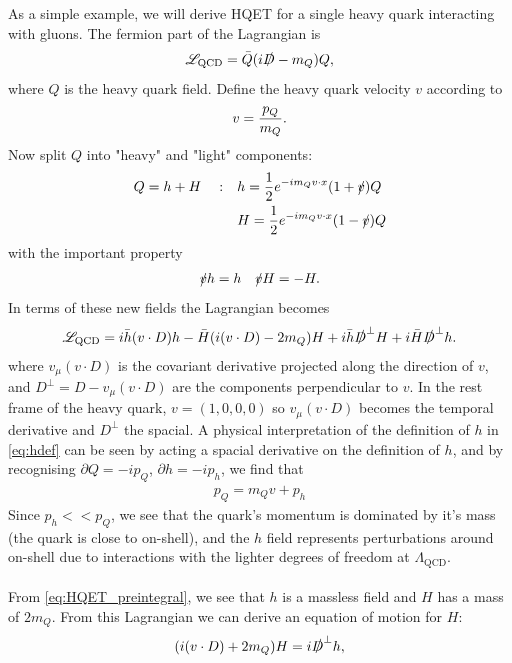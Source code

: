 As a simple example, we will derive HQET for a single heavy quark interacting with gluons. The fermion part of the Lagrangian is
\begin{align}
	\mathscr{L}_{\text{QCD}} = \bar{Q} ( i\slashed{D} - m_Q ) Q,
	\label{eq:dirac}
\end{align}
where $Q$ is the heavy quark field. Define the heavy quark velocity $v$ according to
\begin{align}
	v = {p_Q \over m_Q}.
\end{align}
Now split $Q$ into "heavy" and "light" components:
\begin{align}
	\label{eq:hdef}
	Q = h + H\quad : \quad &h = {1\over 2} e^{-im_Q v\cdot x} ( 1 + \slashed{v} ) Q \\
	&H = {1\over 2} e^{-im_Q v\cdot x} ( 1 - \slashed{v} ) Q
\end{align}
with the important property
\begin{align}
	\slashed{v} h = h \quad \slashed{v} H = - H.
\end{align}
In terms of these new fields the Lagrangian becomes
\begin{align}
	\mathscr{L}_{\text{QCD}} = i\bar{h} (v\cdot D) h - \bar{H} ( i(v\cdot D) - 2m_Q ) H 
		+ i \bar{h} \slashed{D}^{\perp} H + i \bar{H} \slashed{D}^{\perp} h.
		\label{eq:HQET_preintegral}
\end{align}
where $v_{\mu}(v\cdot D)$ is the covariant derivative projected along the direction of $v$, and $D^{\perp} = D - v_{\mu}(v\cdot D)$ are the components perpendicular to $v$. In the rest frame of the heavy quark, $v = (1,0,0,0)$ so $v_{\mu}(v\cdot D)$ becomes the temporal derivative and $D^{\perp}$ the spacial. A physical interpretation of the definition of $h$ in \eqref{eq:hdef} can be seen by acting a spacial derivative on the definition of $h$, and by recognising $\partial Q = -i p_Q$, $\partial h = -i p_h$, we find that
\begin{align}
	p_Q = m_Q v + p_h
\end{align} 
Since $p_h << p_Q$, we see that the quark's momentum is dominated by it's mass (the quark is close to on-shell), and the $h$ field represents perturbations around on-shell due to interactions with the lighter degrees of freedom at $\Lambda_{\text{QCD}}$.
\\ \\
From \eqref{eq:HQET_preintegral}, we see that $h$ is a massless field and $H$ has a mass of $2m_Q$. From this Lagrangian we can derive an equation of motion for $H$:
\begin{align}
	( i(v\cdot D) + 2m_Q) H = i\slashed{D}^{\perp} h,
\end{align}
